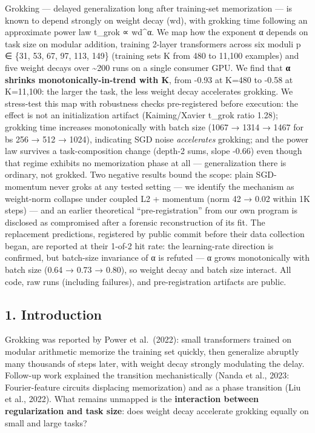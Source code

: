 \documentclass[
  11pt,
]{article}
\begin{document}
Grokking --- delayed generalization long after training-set memorization
--- is known to depend strongly on weight decay (wd), with grokking time
following an approximate power law t\_grok ∝ wd\^{}α. We map how the
exponent α depends on task size on modular addition, training 2-layer
transformers across six moduli p ∈ \{31, 53, 67, 97, 113, 149\}
(training sets K from 480 to 11,100 examples) and five weight decays
over \textasciitilde200 runs on a single consumer GPU. We find that
\textbf{\textbar α\textbar{} shrinks monotonically-in-trend with K},
from -0.93 at K=480 to -0.58 at K=11,100: the larger the task, the less
weight decay accelerates grokking. We stress-test this map with
robustness checks pre-registered before execution: the effect is not an
initialization artifact (Kaiming/Xavier t\_grok ratio 1.28); grokking
time increases monotonically with batch size (1067 → 1314 → 1467 for bs
256 → 512 → 1024), indicating SGD noise \emph{accelerates} grokking; and
the power law survives a task-composition change (depth-2 sums, slope
-0.66) even though that regime exhibits no memorization phase at all ---
generalization there is ordinary, not grokked. Two negative results
bound the scope: plain SGD-momentum never groks at any tested setting
--- we identify the mechanism as weight-norm collapse under coupled L2 +
momentum (norm 42 → 0.02 within 1K steps) --- and an earlier theoretical
``pre-registration'' from our own program is disclosed as compromised
after a forensic reconstruction of its fit. The replacement predictions,
registered by public commit before their data collection began, are
reported at their 1-of-2 hit rate: the learning-rate direction is
confirmed, but batch-size invariance of α is refuted ---
\textbar α\textbar{} grows monotonically with batch size (0.64 → 0.73 →
0.80), so weight decay and batch size interact. All code, raw runs
(including failures), and pre-registration artifacts are public.

\subsection{1. Introduction}\label{introduction}

Grokking was reported by Power et al.~(2022): small transformers trained
on modular arithmetic memorize the training set quickly, then generalize
abruptly many thousands of steps later, with weight decay strongly
modulating the delay. Follow-up work explained the transition
mechanistically (Nanda et al., 2023: Fourier-feature circuits displacing
memorization) and as a phase transition (Liu et al., 2022). What remains
unmapped is the \textbf{interaction between regularization and task
size}: does weight decay accelerate grokking equally on small and large
tasks?
\end{document}
